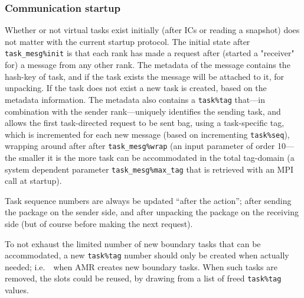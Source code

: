 \documentclass[paper=a4,fontsize=11pt]{scrartcl}
\numberwithin{equation}{section}		%
\numberwithin{figure}{section}			%
\numberwithin{table}{section}				%
\def\ie{i.e.\ }
\begin{document}
\subsubsection{Communication startup}
Whether or not virtual tasks exist initially (after ICs or reading a snapshot) does not matter with the current startup protocol.  The initial state after \verb|task_mesg%init| is that each rank has made a request after (started a "receiver" for) a message from any other rank.  The metadata of the message contains the hash-key of task, and if the task exists the message will be attached to it, for unpacking.  If the task does not exist a new task is created, based on the metadata information.  The metadata also contains a \verb|task%tag| that---in combination with the sender rank---uniquely identifies the sending task, and allows the first task-directed request to be sent bag, using a task-specific tag, which is incremented for each new message (based on incrementing \verb|task%seq|), wrapping around after after \verb|task_mesg%wrap| (an input parameter of order 10---the smaller it is the more task can be accommodated in the total tag-domain (a system dependent parameter \verb|task_mesg%max_tag| that is retrieved with an MPI call at startup).

Task sequence numbers are always be updated ``after the action''; after sending the package on the sender side, and after unpacking the package on the receiving side (but of course before making the next request).

To not exhaust the limited number of new boundary tasks that can be accommodated, a new \verb|task%tag| number should only be created when actually needed; \ie\ when AMR creates new boundary tasks.  When such tasks are removed, the slots could be reused, by drawing from a list of freed \verb|task%tag| values.
\end{document}
